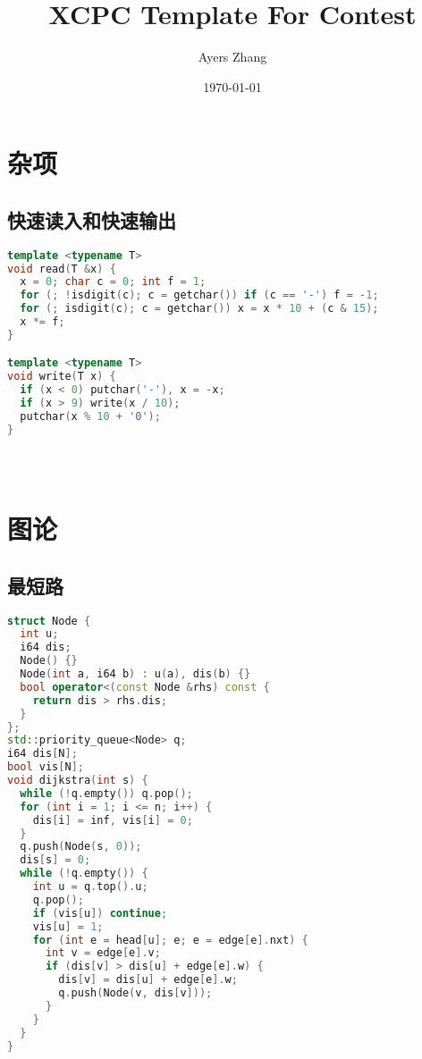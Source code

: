 \documentclass[a4paper,10pt]{article}
\title{XCPC Template For Contest}
\author{Ayers Zhang}
\date{\today}
\begin{document}
\maketitle

\newpage
\begin{center}
    \tableofcontents
\end{center}

\newpage
\section{杂项}
\subsection{快速读入和快速输出}
\begin{lstlisting}[language=c++]
template <typename T> 
void read(T &x) {
  x = 0; char c = 0; int f = 1; 
  for (; !isdigit(c); c = getchar()) if (c == '-') f = -1;
  for (; isdigit(c); c = getchar()) x = x * 10 + (c & 15); 
  x *= f; 
}

template <typename T> 
void write(T x) {
  if (x < 0) putchar('-'), x = -x;
  if (x > 9) write(x / 10); 
  putchar(x % 10 + '0');
}
\end{lstlisting}

\subsection{}
\begin{lstlisting}[language=c++]
  
\end{lstlisting}

\newpage
\section{图论}
\subsection{最短路}
\begin{lstlisting}[language=c++]
struct Node {
  int u;
  i64 dis;
  Node() {}
  Node(int a, i64 b) : u(a), dis(b) {}
  bool operator<(const Node &rhs) const {
    return dis > rhs.dis;
  }
};
std::priority_queue<Node> q;
i64 dis[N];
bool vis[N];
void dijkstra(int s) {
  while (!q.empty()) q.pop();
  for (int i = 1; i <= n; i++) {
    dis[i] = inf, vis[i] = 0; 
  }
  q.push(Node(s, 0));
  dis[s] = 0;
  while (!q.empty()) {
    int u = q.top().u;
    q.pop();
    if (vis[u]) continue;
    vis[u] = 1; 
    for (int e = head[u]; e; e = edge[e].nxt) {
      int v = edge[e].v;
      if (dis[v] > dis[u] + edge[e].w) {
        dis[v] = dis[u] + edge[e].w;
        q.push(Node(v, dis[v]));
      }
    }
  }
}
\end{lstlisting}
\end{document}

